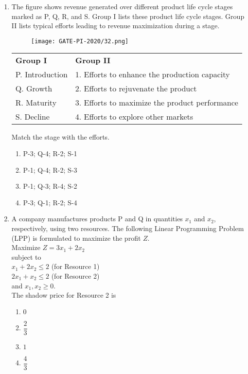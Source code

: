 \documentclass[journal,12pt,onecolumn]{IEEEtran}
\theoremstyle{remark}
\begin{document}
\begin{enumerate}
\item The figure shows revenue generated over different product life cycle stages marked as P, Q, R, and S. Group I lists these product life cycle stages. Group II lists typical efforts leading to revenue maximization during a stage.

\begin{figure}[H]
    \centering
    \texttt{[image: GATE-PI-2020/32.png]}
    \caption{}
    \label{32}
\end{figure}

\begin{tabular}{ll}
\textbf{Group I}     & \textbf{Group II} \\
P. Introduction      & 1. Efforts to enhance the production capacity \\
Q. Growth            & 2. Efforts to rejuvenate the product \\
R. Maturity          & 3. Efforts to maximize the product performance \\
S. Decline           & 4. Efforts to explore other markets \\
\end{tabular}

Match the stage with the efforts.
\begin{enumerate}
    \item P-3; Q-4; R-2; S-1
    \item P-1; Q-4; R-2; S-3
    \item P-1; Q-3; R-4; S-2
    \item P-3; Q-1; R-2; S-4
\end{enumerate}
\vspace{1cm}

\item A company manufactures products P and Q in quantities $x_1$ and $x_2$, respectively, using two resources. The following Linear Programming Problem (LPP) is formulated to maximize the profit $Z$.\\
Maximize $Z = 3x_1 + 2x_2$\\
subject to\\
$x_1 + 2x_2 \leq 2$ \quad (for Resource 1)\\
$2x_1 + x_2 \leq 2$ \quad (for Resource 2)\\
and $x_1, x_2 \geq 0$.\\
The shadow price for Resource 2 is
\begin{multicols}{4}
\begin{enumerate}
    \item $0$
    \item $\dfrac{2}{3}$
    \item $1$
    \item $\dfrac{4}{3}$
\end{enumerate}
\end{multicols}
\vspace{1cm}


\end{enumerate}
\end{document}
